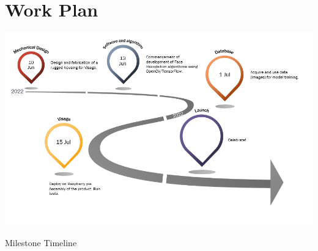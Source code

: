 \section{Work Plan}
\begin{table}[!h]
\includegraphics{Figures/Visage2}
\caption{Milestone Timeline}
\end{table}
